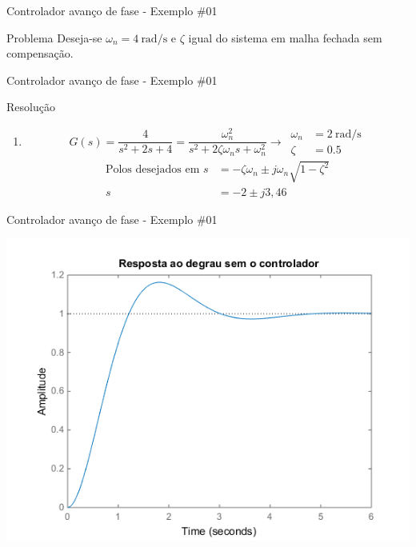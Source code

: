 \begin{frame}{Controlador avanço de fase - Exemplo \#01}
\begin{block}{Problema}
Deseja-se $ \omega_n=\SI{4}{\radian\per\second} $ e $ \zeta $ igual do sistema em malha fechada sem compensação.
\end{block}

\vspace{1cm}

\centering

\scalebox{0.9}{}
\end{frame}

\begin{frame}{Controlador avanço de fase - Exemplo \#01}
	\begin{block}{Resolução}
		\begin{enumerate}
			\item 
			\[ G(s)=\dfrac{4}{s^{2}+2s+4}=\dfrac{\omega_n^{2}}{s^{2}+2\zeta\omega_n s+\omega_n^{2}}\rightarrow \, \begin{aligned}
			\omega_n&=\SI{2}{\radian\per\second}\\
			\zeta&=0.5
			\end{aligned} \]
			\begin{align*}
			\text{Polos desejados em }s&=-\zeta\omega_n\pm j\omega_n\sqrt{1-\zeta^{2}}\\
			s&=-2\pm j3,46
			\end{align*}
		\end{enumerate}
	\end{block}
\end{frame}

\begin{frame}{Controlador avanço de fase - Exemplo \#01}
\centerline{\includegraphics[width=0.8\linewidth]{Figuras/Ch09/fig1.png}}
\end{frame}

